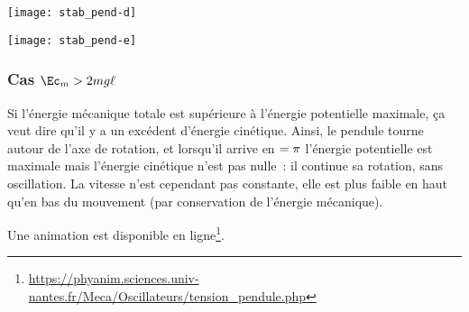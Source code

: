 \documentclass[../main/main.tex]{subfiles}
\begin{document}
\begin{minipage}{0.45\linewidth}
    \begin{center}
        \texttt{[image: stab\_pend-d]}
    \end{center}
\end{minipage}
\hfill
\begin{minipage}{0.45\linewidth}
    \begin{center}
        \texttt{[image: stab\_pend-e]}
    \end{center}
\end{minipage}

\vspace{-15pt}
\subsubsection{Cas $\Ec_m > 2mg\ell$}
Si l'énergie mécanique totale est supérieure à l'énergie potentielle maximale,
ça veut dire qu'il y a un excédent d'énergie cinétique. Ainsi, le pendule tourne
autour de l'axe de rotation, et lorsqu'il arrive en $\tt = \pi$ l'énergie
potentielle est maximale mais l'énergie cinétique n'est pas nulle~: il continue
sa rotation, sans oscillation. La vitesse n'est cependant pas constante, elle
est plus faible en haut qu'en bas du mouvement (par conservation de l'énergie
mécanique).

Une animation est disponible en
ligne\footnote{\url{https://phyanim.sciences.univ-nantes.fr/Meca/Oscillateurs/tension_pendule.php}}.
\end{document}
